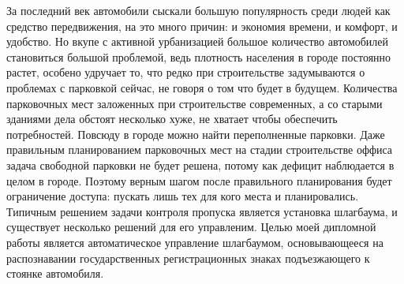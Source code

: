 \label{sec:intro}

За последний век автомобили сыскали большую популярность среди людей как средство передвижения, на это много причин: и экономия времени, и комфорт, и удобство. Но вкупе с активной урбанизацией большое количество автомобилей становиться большой проблемой, ведь плотность населения в городе постоянно растет, особено удручает то, что редко при строительстве задумываются о проблемах с парковкой сейчас, не говоря о том что будет в будущем. Количества парковочных мест заложенных при строительстве современных, а со старыми зданиями дела обстоят несколько хуже, не хватает чтобы обеспечить потребностей. Повсюду в городе можно найти переполненные парковки. Даже правильным планированием парковочных мест на стадии строительстве оффиса задача свободной парковки не будет решена, потому как дефицит наблюдается в целом в городе. Поэтому верным шагом после правильного планирования будет ограничение доступа: пускать лишь тех для кого места и планировались. Типичным решением задачи контроля пропуска является установка шлагбаума, и существует несколько решений для его управленим. Целью моей дипломной работы является автоматическое управление шлагбаумом, основывающееся на распознавании государственных регистрационных знаках подъезжающего к стоянке автомобиля. 

